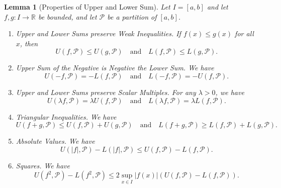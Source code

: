 \documentclass[11pt]{article}
\numberwithin{equation}{section}
\newtheorem{lemma}[theorem]{Lemma}
\theoremstyle{definition}
\theoremstyle{remark}
\newcommand{\pqty}[1]{\left(#1\right)}
\newcommand{\abs}[1]{\left|#1\right|}
\newcommand{\ccintv}[2]{[#1,#2]}
\newcommand{\functiondomain}[3]{#1:#2\to #3}
\newcommand{\RR}{\mathbb R}
\newcommand{\qand}{\quad\text{and}\quad}
\newcommand{\partition}{\mathcal P}
\newcommand{\upperSum}{U}
\newcommand{\lowerSum}{L}
\begin{document}
\begin{lemma}[Properties of Upper and Lower Sum]\label{analysis-unit-0160}
    \label{lem:properties-upper-lower-sum}%
    Let \(I=[a,b]\) and let \(\functiondomain{f, g}{I}{\RR}\) be bounded, and let \(\partition\) be a partition of \(\ccintv{a}{b}\).

    \begin{enumerate}
        \item \textit{Upper and Lower Sums preserve Weak Inequalities.} If \(f\pqty{x} \leq g\pqty{x}\) for all \(x\), then
        \[
            \upperSum\pqty{f, \partition} \leq \upperSum\pqty{g, \partition}
            \qand
            \lowerSum\pqty{f, \partition} \leq \lowerSum\pqty{g, \partition}.
        \]

        \item \textit{Upper Sum of the Negative is Negative the Lower Sum.} We have
        \[
            \upperSum\pqty{-f, \partition} = -\lowerSum\pqty{f, \partition}
            \qand
            \lowerSum\pqty{-f, \partition} = -\upperSum\pqty{f, \partition}.
        \]

        \item \textit{Upper and Lower Sums preserve Scalar Multiples}. For any \(\lambda > 0\), we have
        \[
            \upperSum\pqty{\lambda f, \partition} = \lambda \upperSum\pqty{f, \partition}
            \qand
            \lowerSum\pqty{\lambda f, \partition} = \lambda \lowerSum\pqty{f, \partition}.
        \]

        \item \textit{Triangular Inequalities.} We have
        \[
            \upperSum\pqty{f + g, \partition} \leq \upperSum\pqty{f, \partition} + \upperSum\pqty{g, \partition}
            \qand
            \lowerSum\pqty{f + g, \partition} \geq \lowerSum\pqty{f, \partition} + \lowerSum\pqty{g, \partition}.
        \]

        \item \textit{Absolute Values.} We have
        \[
            \upperSum\pqty{\abs{f}, \partition} - \lowerSum\pqty{\abs{f}, \partition} \leq \upperSum\pqty{f, \partition} - \lowerSum\pqty{f, \partition}.
        \]

        \item \textit{Squares.} We have
        \[
            \upperSum\pqty{f^2, \partition} - \lowerSum\pqty{f^2, \partition} \leq 2 \sup_{x \in I} \abs{f\pqty{x}} \pqty{\upperSum\pqty{f, \partition} - \lowerSum\pqty{f, \partition}}.
        \]
    \end{enumerate}
\end{lemma}
\end{document}
